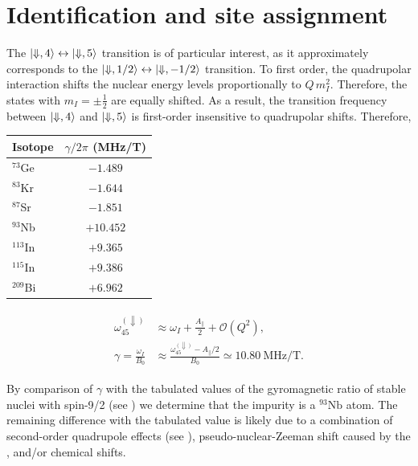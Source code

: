 \section{Identification and site assignment}

The $\ket{\Downarrow,4} \leftrightarrow \ket{\Downarrow,5}$ transition is of particular interest, as it approximately corresponds to the $\ket{\Downarrow,1/2} \leftrightarrow \ket{\Downarrow,-1/2}$ transition. To first order, the quadrupolar interaction shifts the nuclear energy levels proportionally to $Q\, m_I^2$. Therefore, the states with $m_I = \pm \tfrac{1}{2}$ are equally shifted. As a result, the transition frequency between $\ket{\Downarrow,4}$ and $\ket{\Downarrow,5}$ is first-order insensitive to quadrupolar shifts. Therefore,

\begin{margintable}
\centering
\begin{tabular}{l|c}
\hline
Isotope & $\gamma / 2\pi$ (MHz/T) \\ \hline
$^{73}$Ge  & $-1.489$ \\
$^{83}$Kr  & $-1.644$ \\
$^{87}$Sr  & $-1.851$ \\
$^{93}$Nb  & $+10.452$ \\
$^{113}$In & $+9.365$ \\
$^{115}$In & $+9.386$ \\
$^{209}$Bi & $+6.962$ \\ \hline
\end{tabular}
\caption{Gyromagnetic ratios of stable nuclei with spin $I=9/2$.}
\end{margintable}

\begin{align}
\begin{split}
    \omega^{(\Downarrow)}_{45} &\approx \omega_I + \frac{A_\parallel}{2} + \mathcal{O}(Q^2), \\
    \gamma = \frac{\omega_I}{B_0} &\approx \frac{\omega^{(\Downarrow)}_{45} - A_\parallel/2}{B_0} \simeq 10.80~\text{MHz/T}.
\end{split}
\end{align}

By comparison of $\gamma$ with the tabulated values of the gyromagnetic ratio of stable nuclei with spin-9/2 (see ) we determine that the impurity is a $^{93}\mathrm{Nb}$ atom. The remaining difference with the tabulated value is likely due to a combination of second-order quadrupole effects (see ), pseudo-nuclear-Zeeman shift caused by the \Er, and/or chemical shifts.

